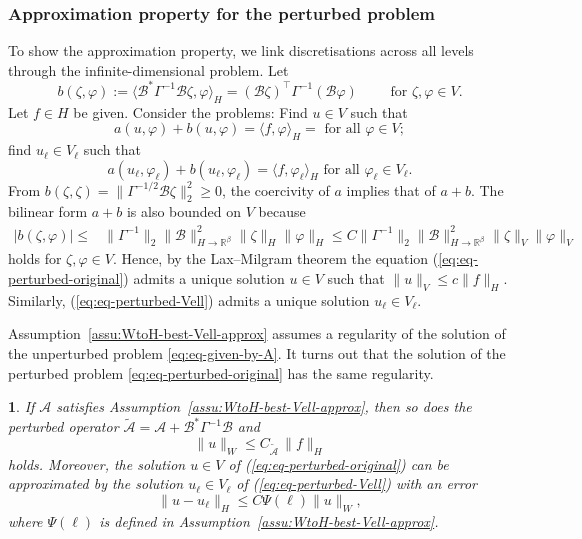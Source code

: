 \documentclass[11pt,english]{article}
\theoremstyle{plain}
\theoremstyle{plain}
\theoremstyle{plain}
\newtheorem{lem}[thm]{\protect\lemmaname}
\theoremstyle{plain}
\numberwithin{equation}{section}
\providecommand{\lemmaname}{Lemma}
\begin{document}
\subsubsection{Approximation property for the perturbed problem}
To show the approximation property, we link discretisations across all levels through the infinite-dimensional problem.
Let
\begin{equation}
	b(\zeta,\varphi):=\langle\mathcal{B}^{*}\Gamma^{-1}\mathcal{B}\zeta,\varphi\rangle_{H}= (\mathcal{B}\zeta)^\top\Gamma^{-1}(\mathcal{B}\varphi)\qquad\text{ for }\zeta,\varphi\in V.
	\label{eqn:b_definition}
\end{equation}
Let $f\in H$ be given. Consider the problems: Find $u\in V$ such
that
\begin{equation}
	a(u,\varphi)+b(u,\varphi)=\langle f,\varphi\rangle_{H}=\text{ for all }\varphi\in V;\label{eq:eq-perturbed-original}
\end{equation}
find $u_{\ell}\in V_{\ell}$ such that
\begin{equation}
	a(u_{\ell},\varphi_{\ell})+b(u_{\ell},\varphi_{\ell})=\langle f,\varphi_{\ell}\rangle_{H}\text{ for all }\varphi_{\ell}\in V_{\ell}.\label{eq:eq-perturbed-Vell}
\end{equation}
From $b(\zeta,\zeta)=\|\Gamma^{-1/2}\mathcal{B}\zeta\|_{2}^{2}\geq0$,
the coercivity of $a$ implies that of $a+b$. The bilinear form $a+b$
is also bounded on $V$ because
\begin{align*}
	|b(\zeta,\varphi)|\leq & \|\Gamma^{-1}\|_{2}\|\mathcal{B}\|_{H\to\mathbb{R}^{\beta}}^{2}\|\zeta\|_{H}\|\varphi\|_{H}\leq C\|\Gamma^{-1}\|_{2}\|\mathcal{B}\|_{H\to\mathbb{R}^{\beta}}^{2}\|\zeta\|_{V}\|\varphi\|_{V}
\end{align*}
holds for $\zeta,\varphi\in V$. Hence, by the Lax--Milgram theorem
the equation (\ref{eq:eq-perturbed-original}) admits a unique solution
$u\in V$ such that $\|u\|_{V}\leq c\|f\|_{H}$. Similarly, (\ref{eq:eq-perturbed-Vell})
admits a unique solution $u_{\ell}\in V_{\ell}$.

Assumption~\ref{assu:WtoH-best-Vell-approx} assumes a regularity of the solution of the unperturbed problem  \eqref{eq:eq-given-by-A}.
It turns out that the solution of the perturbed problem \eqref{eq:eq-perturbed-original} has the same regularity.
\begin{lem}\label{lem:approximation-perturbed}
	If $\mathcal{A}$ satisfies Assumption~\ref{assu:WtoH-best-Vell-approx},
	then so does the perturbed operator $\widetilde{\mathcal{A}}=\mathcal{A}+\mathcal{B}^{*}\Gamma^{-1}\mathcal{B}$ and
	\begin{equation}
		\|u\|_{W}  \leq C_{\widetilde{\mathcal{A}}}\,\|f\|_{H}\label{eq:perturbedu-Wnorm-bound}
	\end{equation}
	holds. Moreover, the solution $u\in V$ of (\ref{eq:eq-perturbed-original})
	can be approximated by the solution $u_{\ell}\in V_{\ell}$ of (\ref{eq:eq-perturbed-Vell})
	with an error
	\begin{equation}
		\|u-u_{\ell}\|_{H}\leq C\Psi(\ell)\|u\|_{W},\label{eq:perturbed-H-W-bound}
              \end{equation}
          where $\Psi(\ell)$ is defined in Assumption~\ref{assu:WtoH-best-Vell-approx}.
\end{lem}
\end{document}
